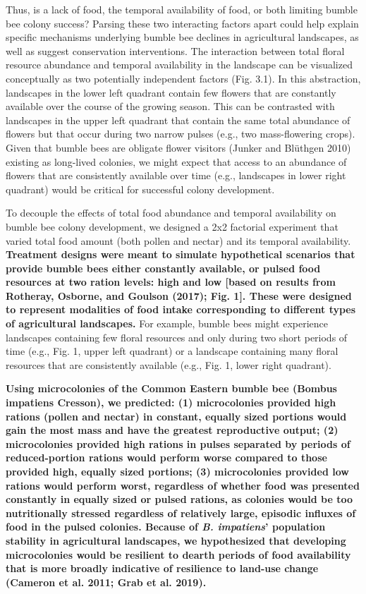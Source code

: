 \documentclass[11pt,]{article}
\begin{document}
Thus, is a lack of food, the temporal availability of food, or both
limiting bumble bee colony success? Parsing these two interacting
factors apart could help explain specific mechanisms underlying bumble
bee declines in agricultural landscapes, as well as suggest conservation
interventions. The interaction between total floral resource abundance
and temporal availability in the landscape can be visualized
conceptually as two potentially independent factors (Fig. 3.1). In this
abstraction, landscapes in the lower left quadrant contain few flowers
that are constantly available over the course of the growing season.
This can be contrasted with landscapes in the upper left quadrant that
contain the same total abundance of flowers but that occur during two
narrow pulses (e.g., two mass-flowering crops). Given that bumble bees
are obligate flower visitors (Junker and Blüthgen 2010) existing as
long-lived colonies, we might expect that access to an abundance of
flowers that are consistently available over time (e.g., landscapes in
lower right quadrant) would be critical for successful colony
development.

To decouple the effects of total food abundance and temporal
availability on bumble bee colony development, we designed a 2x2
factorial experiment that varied total food amount (both pollen and
nectar) and its temporal availability. \textbf{Treatment designs were
meant to simulate hypothetical scenarios that provide bumble bees either
constantly available, or pulsed food resources at two ration levels:
high and low {[}based on results from Rotheray, Osborne, and Goulson
(2017); Fig. 1{]}. These were designed to represent modalities of food
intake corresponding to different types of agricultural landscapes.} For
example, bumble bees might experience landscapes containing few floral
resources and only during two short periods of time (e.g., Fig. 1, upper
left quadrant) or a landscape containing many floral resources that are
consistently available (e.g., Fig. 1, lower right quadrant).

\textbf{Using microcolonies of the Common Eastern bumble bee (Bombus
impatiens Cresson), we predicted: (1) microcolonies provided high
rations (pollen and nectar) in constant, equally sized portions would
gain the most mass and have the greatest reproductive output; (2)
microcolonies provided high rations in pulses separated by periods of
reduced-portion rations would perform worse compared to those provided
high, equally sized portions; (3) microcolonies provided low rations
would perform worst, regardless of whether food was presented constantly
in equally sized or pulsed rations, as colonies would be too
nutritionally stressed regardless of relatively large, episodic influxes
of food in the pulsed colonies. Because of \emph{B. impatiens}'
population stability in agricultural landscapes, we hypothesized that
developing microcolonies would be resilient to dearth periods of food
availability that is more broadly indicative of resilience to land-use
change (Cameron et al. 2011; Grab et al. 2019).}
\end{document}
